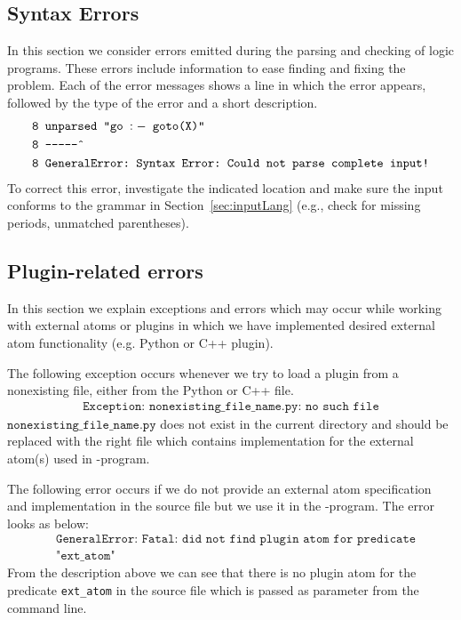 \documentclass[a4paper, titlepage]{article}
\DeclareMathOperator{\leftimpl}{:-}
\begin{document}
\subsection{Syntax Errors}
In this section we consider errors emitted during the parsing and checking of logic programs.
These errors include information to ease finding and fixing the problem. Each of the error messages shows a line in which the error appears, followed by the type of the error and a short description.
\begin{align*}
 & \texttt{8 unparsed "go $\leftimpl$ goto(X)" }\\
 & \texttt{8 ----------\^{}} \\
 & \texttt{8 GeneralError:~Syntax Error:~Could not parse complete input!}
\end{align*}
%
To correct this error, investigate the indicated location and make sure the input conforms to the grammar in Section~\ref{sec:inputLang} (e.g., check for missing periods, unmatched parentheses).

\subsection{Plugin-related errors}
In this section we explain exceptions and errors 
which may occur while working with external atoms 
or plugins in which we have implemented desired external atom functionality (e.g. Python or C++ plugin). 

The following exception occurs whenever we try to
load a plugin from a nonexisting file, either from the Python or C++ file.
\begin{align*}
\texttt{Exception:~nonexisting\_file\_name.py:~no such file}
\end{align*}
$\texttt{nonexisting\_file\_name.py}$ does not exist in the current directory and should be replaced with
the right file which contains implementation for the external atom(s) used in \hex{}-program.

The following error occurs if we do not provide an external atom specification and implementation 
in the source file but we use it in the \hex{}-program. The error looks as below:
\begin{align*}
& \texttt{GeneralError:~Fatal:~did not find plugin atom for predicate}\\ 
& \texttt{"ext\_atom"}
\end{align*}  
From the description above we can see that there is no plugin atom for the predicate \texttt{ext\_atom}
in the source file which is passed as parameter from the command line.
\end{document}
